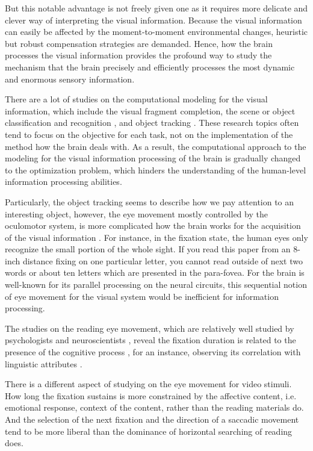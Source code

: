\documentclass[oneside,master]{snueethesis}
\begin{document}
But this notable advantage is not freely given one as it requires more delicate and clever way of interpreting the visual information. Because the visual information can easily be affected by the moment-to-moment environmental changes, heuristic but robust compensation strategies are demanded. Hence, how the brain processes the visual information provides the profound way to study the mechanism that the brain precisely and efficiently processes the most dynamic and enormous sensory information.

There are a lot of studies on the computational modeling for the visual information, which include the visual fragment completion, the scene or object classification and recognition \cite{winn2005,lazebnik2006}, and object tracking \cite{YiWu2013}. These research topics often tend to focus on the objective for each task, not on the implementation of the method how the brain deals with. As a result, the computational approach to the modeling for the visual information processing of the brain is gradually changed to the optimization problem, which hinders the understanding of the human-level information processing abilities. 

Particularly, the object tracking seems to describe how we pay attention to an interesting object, however, the eye movement mostly controlled by the oculomotor system, is more complicated how the brain works for the acquisition of the visual information \cite{Henderson2003}. For instance, in the fixation state, the human eyes only recognize the small portion of the whole sight. If you read this paper from an 8-inch distance fixing on one particular letter, you cannot read outside of next two words or about ten letters which are presented in the para-fovea. For the brain is well-known for its parallel processing on the neural circuits, this sequential notion of eye movement for the visual system would be inefficient for information processing.

The studies on the reading eye movement, which are relatively well studied by psychologists and neuroscientists \cite{Rayner1998,Reichle1998}, reveal the fixation duration is related to the presence of the cognitive process \cite{Rayner1997}, for an instance, observing its correlation with linguistic attributes \cite{Inhoff1986,Rayner1986}.

There is a different aspect of studying on the eye movement for video stimuli. How long the fixation sustains is more constrained by the affective content, i.e. emotional response, context of the content, rather than the reading materials do. And the selection of the next fixation and the direction of a saccadic movement tend to be more liberal than the dominance of horizontal searching of reading does. 
\end{document}
